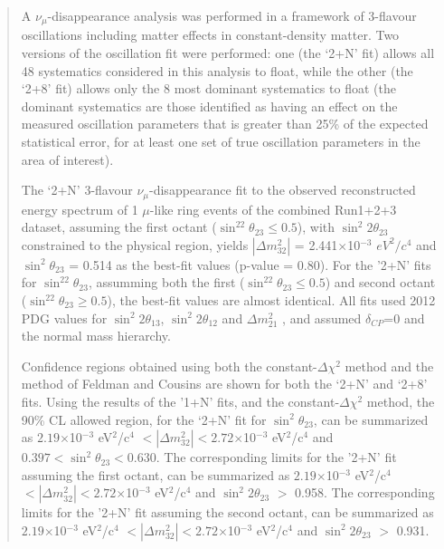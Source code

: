 \begin{frontmatter}
\begin{abstract}
A $\nu_{\mu}$-disappearance analysis was performed 
in a framework of 3-flavour oscillations including matter effects in constant-density matter.
Two versions of the oscillation fit were performed:
one (the `2+N' fit) allows all 48 systematics considered in this analysis to float, 
while the other (the `2+8' fit) allows only the 8 most dominant systematics to float
(the dominant systematics are those identified as having an effect on the measured oscillation parameters
that is greater than 25\% of the expected statistical error, for at least one set of true oscillation parameters in the area of interest). 

The `2+N' 3-flavour $\nu_{\mu}$-disappearance fit to
the observed reconstructed energy spectrum of 1 $\mu$-like ring events of the combined Run1+2+3 dataset,
assuming the first octant ($\sin^22\theta_{23} \leq 0.5$),
with $\sin^{2}2\theta_{23}$ constrained to the physical region,
yields
$|\Delta m^{2}_{32}|$ = 2.441$\times$10$^{-3}$ $eV^{2}/c^{4}$  and
$\sin^{2}\theta_{23}$ = 0.514
as the best-fit values (p-value = 0.80).
For the '2+N' fits for $\sin^22\theta_{23}$, assumming both the first ($\sin^22\theta_{23} \leq 0.5$)
and second octant ($\sin^22\theta_{23} \geq 0.5$),
the best-fit values are almost identical.
All fits used 2012 PDG values for
$\sin^{2}2\theta_{13}$, $\sin^{2}2\theta_{12}$ and $\Delta m^{2}_{21}$ \cite{PDG2012},
and assumed $\delta_{CP}$=0 and the normal mass hierarchy.

Confidence regions obtained using both the constant-$\Delta\chi^2$ method and the 
method of Feldman and Cousins are shown for both the `2+N' and `2+8' fits.
Using the results of the '1+N' fits, 
and the constant-$\Delta\chi^2$ method,
the 90\% CL allowed region, for the `2+N' fit for $\sin^2\theta_{23}$, can be summarized as
$2.19$$\times$10$^{-3}$ eV$^{2}$/c$^{4}$ $< |\Delta m^2_{32}| < 2.72$$\times$10$^{-3}$ eV$^{2}$/c$^{4}$ and
$0.397 < \sin^{2}\theta_{23} < 0.630$.
The corresponding limits for the '2+N' fit assuming the first octant, can be summarized as
$2.19$$\times$10$^{-3}$ eV$^{2}$/c$^{4}$ $< |\Delta m^2_{32}| < 2.72$$\times$10$^{-3}$ eV$^{2}$/c$^{4}$ and
$\sin^{2}2\theta_{23}$ $>$ 0.958.
The corresponding limits for the '2+N' fit assuming the second octant, can be summarized as
$2.19$$\times$10$^{-3}$ eV$^{2}$/c$^{4}$ $< |\Delta m^2_{32}| < 2.72$$\times$10$^{-3}$ eV$^{2}$/c$^{4}$ and
$\sin^{2}2\theta_{23}$ $>$ 0.931.


\end{abstract}
\end{frontmatter}
